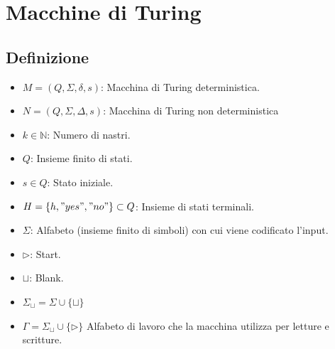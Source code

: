 \section{Macchine di Turing}
\subsection{Definizione}
\label{def:mdt}
\begin{itemize}
    \item $M = (Q, \Sigma, \delta, s)$: Macchina di Turing deterministica.
    \item $N = (Q, \Sigma, \Delta, s)$: Macchina di Turing non deterministica
    \item $k \in \mathbb{N}$: Numero di nastri.
\end{itemize}

\hrulefill

\begin{itemize}
    \item $Q$: Insieme finito di stati.
    \item $s \in Q$: Stato iniziale.
    \item $H = \{h, "yes", "no"\} \subset Q$: Insieme di stati terminali.
\end{itemize}

\hrulefill

\begin{itemize}
    \item $\Sigma$: Alfabeto (insieme finito di simboli) con cui viene codificato l'input.
    \item $\triangleright$: Start.
    \item $\sqcup$: Blank.
    \item $\Sigma_\sqcup = \Sigma \cup \{\sqcup\}$
    \item $\Gamma = \Sigma_\sqcup \cup \{\triangleright\}$ Alfabeto di lavoro che la macchina utilizza per letture e scritture.
\end{itemize}

\hrulefill

